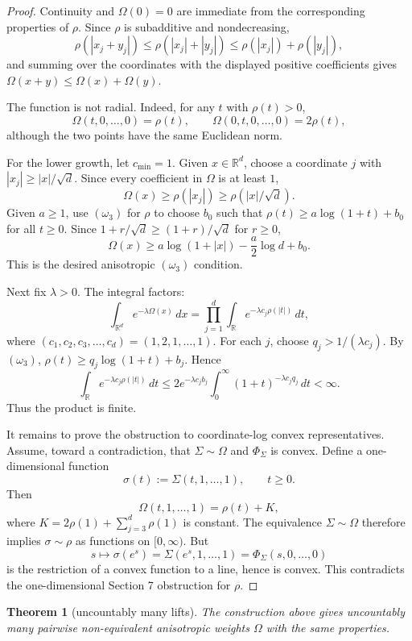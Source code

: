 \documentclass[11pt]{article}
\newtheorem{theorem}{Theorem}
\newcommand{\R}{\mathbb{R}}
\newcommand{\dd}{\,d}
\begin{document}
\begin{proof}
Continuity and $\Omega(0)=0$ are immediate from the corresponding properties of
$\rho$.  Since $\rho$ is subadditive and nondecreasing,
\[
  \rho(|x_j+y_j|)
  \le \rho(|x_j|+|y_j|)
  \le \rho(|x_j|)+\rho(|y_j|),
\]
and summing over the coordinates with the displayed positive coefficients gives
$\Omega(x+y)\le\Omega(x)+\Omega(y)$.

The function is not radial.  Indeed, for any $t$ with $\rho(t)>0$,
\[
  \Omega(t,0,\ldots,0)=\rho(t),
  \qquad
  \Omega(0,t,0,\ldots,0)=2\rho(t),
\]
although the two points have the same Euclidean norm.

For the lower growth, let $c_{\min}=1$.  Given $x\in\R^d$, choose a coordinate
$j$ with $|x_j|\ge |x|/\sqrt d$.  Since every coefficient in $\Omega$ is at
least $1$,
\[
  \Omega(x)\ge \rho(|x_j|)\ge \rho(|x|/\sqrt d).
\]
Given $a\ge 1$, use $(\omega_3)$ for $\rho$ to choose $b_0$ such that
$\rho(t)\ge a\log(1+t)+b_0$ for all $t\ge0$.  Since
$1+r/\sqrt d\ge (1+r)/\sqrt d$ for $r\ge0$,
\[
  \Omega(x)\ge a\log(1+|x|)-\frac a2\log d+b_0.
\]
This is the desired anisotropic $(\omega_3)$ condition.

Next fix $\lambda>0$.  The integral factors:
\[
  \int_{\R^d} e^{-\lambda\Omega(x)}\dd x
  =
  \prod_{j=1}^d \int_\R e^{-\lambda c_j\rho(|t|)}\dd t,
\]
where $(c_1,c_2,c_3,\ldots,c_d)=(1,2,1,\ldots,1)$.  For each $j$, choose
$q_j>1/(\lambda c_j)$.  By $(\omega_3)$, $\rho(t)\ge q_j\log(1+t)+b_j$.
Hence
\[
  \int_\R e^{-\lambda c_j\rho(|t|)}\dd t
  \le
  2e^{-\lambda c_j b_j}
  \int_0^\infty (1+t)^{-\lambda c_j q_j}\dd t
  <\infty.
\]
Thus the product is finite.

It remains to prove the obstruction to coordinate-log convex representatives.
Assume, toward a contradiction, that $\Sigma\sim\Omega$ and
$\Phi_\Sigma$ is convex.  Define a one-dimensional function
\[
  \sigma(t):=\Sigma(t,1,\ldots,1),\qquad t\ge0.
\]
Then
\[
  \Omega(t,1,\ldots,1)
  =
  \rho(t)+K,
\]
where $K=2\rho(1)+\sum_{j=3}^d \rho(1)$ is constant.  The equivalence
$\Sigma\sim\Omega$ therefore implies $\sigma\sim\rho$ as functions on
$[0,\infty)$.  But
\[
  s\mapsto \sigma(e^s)
  =
  \Sigma(e^s,1,\ldots,1)
  =
  \Phi_\Sigma(s,0,\ldots,0)
\]
is the restriction of a convex function to a line, hence is convex.  This
contradicts the one-dimensional Section 7 obstruction for $\rho$.
\end{proof}

\begin{theorem}[uncountably many lifts]
The construction above gives uncountably many pairwise non-equivalent
anisotropic weights $\Omega$ with the same properties.
\end{theorem}
\end{document}
